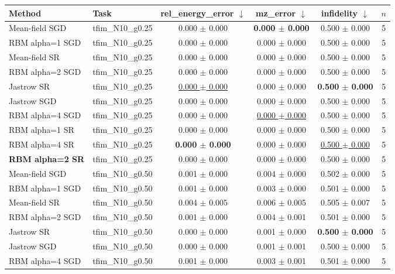 \begin{tabular}{llcccc}
\toprule
Method & Task & rel\_energy\_error $\downarrow$ & mz\_error $\downarrow$ & infidelity $\downarrow$ & $n$ \\
\midrule
Mean-field SGD & tfim\_N10\_g0.25 & 0.000 $\pm$ 0.000 & \textbf{0.000 $\pm$ 0.000} & 0.500 $\pm$ 0.000 & 5 \\
RBM alpha=1 SGD & tfim\_N10\_g0.25 & 0.000 $\pm$ 0.000 & 0.000 $\pm$ 0.000 & 0.500 $\pm$ 0.000 & 5 \\
Mean-field SR & tfim\_N10\_g0.25 & 0.000 $\pm$ 0.000 & 0.000 $\pm$ 0.000 & 0.500 $\pm$ 0.000 & 5 \\
RBM alpha=2 SGD & tfim\_N10\_g0.25 & 0.000 $\pm$ 0.000 & 0.000 $\pm$ 0.000 & 0.500 $\pm$ 0.000 & 5 \\
Jastrow SR & tfim\_N10\_g0.25 & \underline{0.000 $\pm$ 0.000} & 0.000 $\pm$ 0.000 & \textbf{0.500 $\pm$ 0.000} & 5 \\
Jastrow SGD & tfim\_N10\_g0.25 & 0.000 $\pm$ 0.000 & 0.000 $\pm$ 0.000 & 0.500 $\pm$ 0.000 & 5 \\
RBM alpha=4 SGD & tfim\_N10\_g0.25 & 0.000 $\pm$ 0.000 & \underline{0.000 $\pm$ 0.000} & 0.500 $\pm$ 0.000 & 5 \\
RBM alpha=1 SR & tfim\_N10\_g0.25 & 0.000 $\pm$ 0.000 & 0.000 $\pm$ 0.000 & 0.500 $\pm$ 0.000 & 5 \\
RBM alpha=4 SR & tfim\_N10\_g0.25 & \textbf{0.000 $\pm$ 0.000} & 0.000 $\pm$ 0.000 & \underline{0.500 $\pm$ 0.000} & 5 \\
\textbf{RBM alpha=2 SR} & tfim\_N10\_g0.25 & 0.000 $\pm$ 0.000 & 0.000 $\pm$ 0.000 & 0.500 $\pm$ 0.000 & 5 \\
\midrule
Mean-field SGD & tfim\_N10\_g0.50 & 0.001 $\pm$ 0.000 & 0.004 $\pm$ 0.000 & 0.502 $\pm$ 0.000 & 5 \\
RBM alpha=1 SGD & tfim\_N10\_g0.50 & 0.001 $\pm$ 0.000 & 0.003 $\pm$ 0.000 & 0.501 $\pm$ 0.000 & 5 \\
Mean-field SR & tfim\_N10\_g0.50 & 0.004 $\pm$ 0.005 & 0.006 $\pm$ 0.005 & 0.505 $\pm$ 0.007 & 5 \\
RBM alpha=2 SGD & tfim\_N10\_g0.50 & 0.001 $\pm$ 0.000 & 0.004 $\pm$ 0.001 & 0.501 $\pm$ 0.000 & 5 \\
Jastrow SR & tfim\_N10\_g0.50 & 0.000 $\pm$ 0.000 & 0.001 $\pm$ 0.000 & \textbf{0.500 $\pm$ 0.000} & 5 \\
Jastrow SGD & tfim\_N10\_g0.50 & 0.000 $\pm$ 0.000 & 0.001 $\pm$ 0.001 & 0.500 $\pm$ 0.000 & 5 \\
RBM alpha=4 SGD & tfim\_N10\_g0.50 & 0.001 $\pm$ 0.000 & 0.003 $\pm$ 0.001 & 0.501 $\pm$ 0.000 & 5 \\

\end{tabular}
